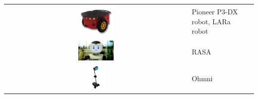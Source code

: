 \begin{table}[h]
{\begin{tabularx}{1.3\textwidth}{ c|X|X|}
\cline{2-3}
\includegraphics[width=0.2\textwidth]{robot_table/pioneer3dx.png} & Pioneer P3-DX robot, LARa robot  & \cite{8588580} \\
\cline{2-3}
\includegraphics[width=0.2\textwidth]{robot_table/RASA.png} & RASA    &  \cite{Esfandbod2023-eq} \\
\cline{2-3}
\includegraphics[width=0.11\textwidth]{robot_table/ohmni.jpg} & Ohmni & \cite{Devaram2022-qc} \\
\cline{2-3}
\end{tabularx}
}
\end{table}
\clearpage{}

